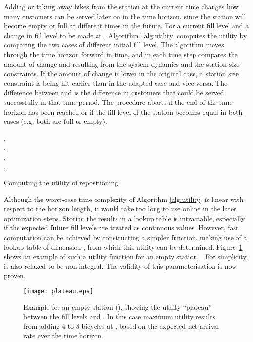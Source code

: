 \documentclass{article}
\begin{document}
Adding or taking away bikes from the station at the current time changes how
many customers can be served later on in the time horizon, since the station
will become empty or full at different times in the future. For a current fill
level  and a change in fill level  to be made at ,
Algorithm~\ref{alg:utility} computes the utility  by
comparing the two cases of different initial fill level. The algorithm moves
through the time horizon forward in time, and in each time step compares the
amount of change  and  resulting from the system dynamics
and the station size constraints. If the amount of change is lower in the
original case, a station size constraint is being hit earlier than in the
adapted case and vice versa. The difference between  and 
is the difference in customers that could be served successfully in that time
period. The procedure aborts if the end of the time horizon has been
reached or if the fill level of the station becomes equal in both cases (e.g.
both are full or empty).
\begin{algorithm}
\begin{algorithmic}[1]
\Require  {}, \\
 , \\
 , \\
 , \\
\State {}
\EndIf
\State 
\State 
\State 
\State {}
\EndProcedure
\end{algorithmic}
\caption{Computing the utility of repositioning}
\label{alg:utility}
\end{algorithm}

Although the worst-case time complexity of Algorithm \ref{alg:utility} is linear
with respect to the horizon length, it would take too long to use online in the
later optimization steps. Storing the results in a lookup table is intractable,
especially if the expected future fill levels are treated as continuous values.
However, fast computation can be achieved by constructing a simpler function,
making use of a lookup table of dimension , from which
this utility can be determined. Figure~\ref{fig:plateau} shows an example of
such a utility function for an empty station, . For
simplicity,  is also relaxed to be non-integral. The validity of this
parameterisation is now proven.
\begin{figure}
  \centering
  \texttt{[image: plateau.eps]}
  \caption{Example for an empty station (), showing the utility ``plateau''
    between the fill levels  and . In this case maximum utility results from adding 4 to 8 bicycles at , based on the expected net arrival rate over the time horizon.}
  \label{fig:plateau}
\end{figure}
\end{document}
